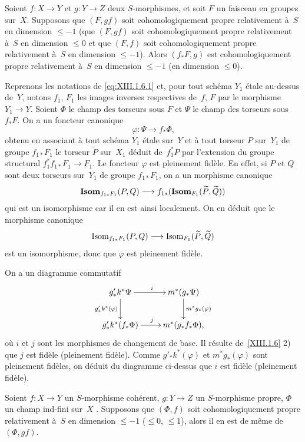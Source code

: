 \begin{corollaire}
\label{XIII.1.7}
Soient $f \colon X \to Y$ et $g \colon Y \to Z$ deux $S$-morphismes,
et soit $F$ un faisceau en groupes sur~$X$. Supposons que $(F,gf)$
soit cohomologiquement propre relativement \`a~$S$ en dimension
$\leqslant -1$ (\resp que $(F,gf)$ soit cohomologiquement propre
relativement \`a~$S$ en dimension $\leqslant 0$ et que $(F,f)$ soit
cohomologiquement propre relativement \`a~$S$ en dimension
$\leqslant -1$). Alors $(f_* F, g)$ est cohomologiquement propre
relativement \`a~$S$ en dimension $\leqslant -1$ (\resp en dimension
$\leqslant 0$).
\end{corollaire}

Reprenons les notations de \eqref{eq:XIII.1.6.1} et, pour tout
sch\'ema $Y_1$ \'etale au-dessus de~$Y$, notons $f_1$, $F_1$ les
images inverses respectives de~$f$, $F$ par le morphisme $Y_1 \to
Y$. Soient $\Phi$ le champ des torseurs sous $F$ et $\Psi$ le champ
des torseurs sous $f_* F$. On a un foncteur canonique
$$
\varphi \colon \Psi \to f_* \Phi \text{,}
$$
obtenu en associant \`a tout sch\'ema $Y_1$ \'etale sur~$Y$ et
\`a tout torseur $P$ sur~$Y_1$ de groupe $f_{1 *}F_1$ le torseur
$\tilde{P}$ sur~$X_1$ d\'eduit de~$f_1^* P$ par l'extension du
groupe structural $f_1^* f_{1 *}F_1 \to F_1$. Le foncteur
$\varphi$ est pleinement fid\`ele. En effet, si $P$ et $Q$ sont deux
torseurs sur~$Y_1$ de groupe $f_{1 *} F_1$, on a un morphisme
canonique
$$
\SheafIsom_{f_{1 *}F_1}(P,Q) \to
f_{1*}(\SheafIsom_{F_1}(\tilde{P},\tilde{Q}))
$$
qui
est un isomorphisme car il en est ainsi localement. On en d\'eduit
que le morphisme canonique
$$
\Isom_{f_{1 *}F_1}(P,Q) \to \Isom_{F_1}(\tilde{P},\tilde{Q})
$$
est un isomorphisme, donc que $\varphi$ est pleinement fid\`ele.

On a un diagramme commutatif
$$
\xymatrix{{g'_* k^* \Psi}\ar[r]^i\ar[d]_{g'_*
k^*(\varphi)}&{m^*(g_* \Psi)}\ar[d]^{m^*
g_*(\varphi)}\\{g'_* k^*(f_* \Phi)}\ar[r]^j&{m^*(g_* f_* \Phi)\text{,}}}
$$
o\`u $i$ et $j$ sont les morphismes de changement de base. Il
r\'esulte de~\ref{XIII.1.6} 2) que $j$ est fid\`ele
(\resp pleinement fid\`ele). Comme $g'_* k^* (\varphi)$ et
$m^* g_* (\varphi)$ sont pleinement fid\`eles, on d\'eduit
du diagramme ci-dessus que $i$ est fid\`ele (\resp pleinement
fid\`ele).

\begin{corollaire}
\label{XIII.1.8}
Soient $f \colon X \to Y$ un $S$-morphisme coh\'erent, $g \colon Y
\to Z$ un $S$-morphisme propre, $\Phi$ un champ ind-fini sur~$X$ \textup{\cite[VII 2.2.1]{XIII.2}}. Supposons que $(\Phi,f)$ soit cohomologiquement propre
relativement \`a~$S$ en dimension $\leqslant -1$ (\resp $\leqslant
0$, \resp $\leqslant 1$), alors il en est de m\^eme de~$(\Phi, gf)$.
\end{corollaire}

